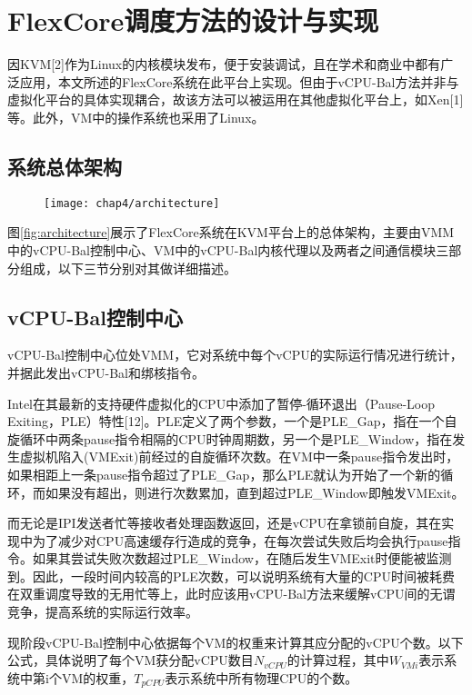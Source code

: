 \section{FlexCore调度方法的设计与实现}

因KVM[2]作为Linux的内核模块发布，便于安装调试，且在学术和商业中都有广泛应用，本文所述的FlexCore系统在此平台上实现。但由于vCPU-Bal方法并非与虚拟化平台的具体实现耦合，故该方法可以被运用在其他虚拟化平台上，如Xen[1]等。此外，VM中的操作系统也采用了Linux。

\subsection{系统总体架构}

\begin{figure}[!htp]
  \centering
  \texttt{[image: chap4/architecture]}
\end{figure}

图\ref{fig:architecture}展示了FlexCore系统在KVM平台上的总体架构，主要由VMM中的vCPU-Bal控制中心、VM中的vCPU-Bal内核代理以及两者之间通信模块三部分组成，以下三节分别对其做详细描述。

\subsection{vCPU-Bal控制中心}

vCPU-Bal控制中心位处VMM，它对系统中每个vCPU的实际运行情况进行统计，并据此发出vCPU-Bal和绑核指令。

Intel在其最新的支持硬件虚拟化的CPU中添加了暂停-循环退出（Pause-Loop Exiting，PLE）特性[12]。PLE定义了两个参数，一个是PLE\_Gap，指在一个自旋循环中两条pause指令相隔的CPU时钟周期数，另一个是PLE\_Window，指在发生虚拟机陷入(VMExit)前经过的自旋循环次数。在VM中一条pause指令发出时，如果相距上一条pause指令超过了PLE\_Gap，那么PLE就认为开始了一个新的循环，而如果没有超出，则进行次数累加，直到超过PLE\_Window即触发VMExit。

而无论是IPI发送者忙等接收者处理函数返回，还是vCPU在拿锁前自旋，其在实现中为了减少对CPU高速缓存行造成的竞争，在每次尝试失败后均会执行pause指令。如果其尝试失败次数超过PLE\_Window，在随后发生VMExit时便能被监测到。因此，一段时间内较高的PLE次数，可以说明系统有大量的CPU时间被耗费在双重调度导致的无用忙等上，此时应该用vCPU-Bal方法来缓解vCPU间的无谓竞争，提高系统的实际运行效率。

现阶段vCPU-Bal控制中心依据每个VM的权重来计算其应分配的vCPU个数。以下公式，具体说明了每个VM获分配vCPU数目$N_{vCPU}$的计算过程，其中$W_{VMi}$表示系统中第i个VM的权重，$T_{pCPU}$表示系统中所有物理CPU的个数。

